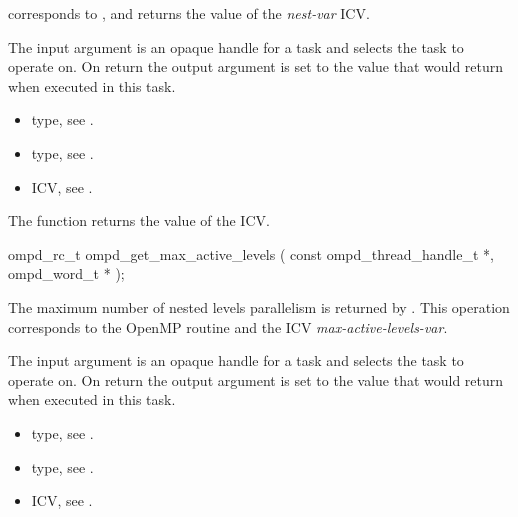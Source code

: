 \descr
{} corresponds to ,
and returns the value of the \emph{nest-var} ICV.

\argdesc
The input argument  is an opaque handle for a task and selects the task to operate on.
On return the output argument  is set to the value that  would return when
executed in this task.

\crossreferences
\begin{itemize}
	\item {} type, see .
	\item {} type, see .
	\item {} ICV, see .
\end{itemize}


\label{ompd:ompd_get_max_active_levels}
\summary
The  function returns the value of the  ICV.

\format
\cspecificstart
\begin{boxedcode}
ompd\_rc\_t ompd\_get\_max\_active\_levels (
  const ompd\_thread\_handle\_t  *, 
  ompd\_word\_t * 
);
\end{boxedcode}
\cspecificend

\descr
The maximum number of nested levels parallelism is returned by
.
This operation corresponds to the OpenMP routine
and the ICV \emph{max-active-levels-var}.%

\argdesc
The input argument  is an opaque handle for a task and selects the task to operate on.
On return the output argument  is set to the value that  would return when
executed in this task.

\crossreferences
\begin{itemize}
	\item {} type, see .
	\item {} type, see .
	\item {} ICV, see .
\end{itemize}



